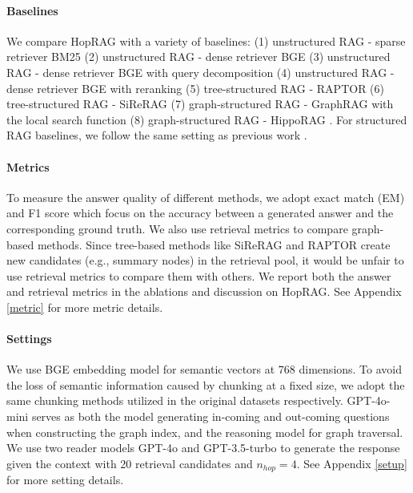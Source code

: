 \paragraph{Baselines}
We compare HopRAG with a variety of baselines: (1) unstructured RAG - sparse retriever BM25 \citep{robertson_probabilistic_2009} 
 (2) unstructured RAG - dense retriever BGE \citep{BGE,karpukhin2020densepassageretrievalopendomain} (3) unstructured RAG - dense retriever BGE with query decomposition \citep{min-etal-2019-multi} (4) unstructured RAG - dense retriever BGE with reranking \citep{nogueira2020passagererankingbert} (5) tree-structured RAG - RAPTOR \citep{sarthi_raptor_2024} (6) tree-structured RAG - SiReRAG \citep{zhang2024sireragindexingsimilarrelated} (7) graph-structured RAG - GraphRAG \citep{edge_local_2024} with the local search function (8) graph-structured RAG - HippoRAG \citep{gutiérrez2025hipporagneurobiologicallyinspiredlongterm}. For structured RAG baselines, we follow the same setting as previous work \citep{zhang2024sireragindexingsimilarrelated}. 

\paragraph{Metrics}
To measure the answer quality of different methods, we adopt exact match (EM) and F1 score which focus on the accuracy between a generated answer and the corresponding ground truth. We also use retrieval metrics to compare graph-based methods. Since tree-based methods like SiReRAG \citep{zhang2024sireragindexingsimilarrelated} and RAPTOR \citep{sarthi_raptor_2024} create new candidates (e.g., summary nodes) in the retrieval pool, it would be unfair to use retrieval metrics to compare them with others. We report both the answer and retrieval metrics in the ablations and discussion on HopRAG. See Appendix \ref{metric} for more metric details.
\paragraph{Settings}
We use BGE embedding model for semantic vectors at 768 dimensions. To avoid the loss of semantic information caused by chunking at a fixed size, we adopt the same chunking methods utilized in the original datasets respectively. 
GPT-4o-mini serves as both the model generating in-coming and out-coming questions when constructing the graph index, and the reasoning model for graph traversal. We use two reader models GPT-4o and GPT-3.5-turbo to generate the response given the context with 20 retrieval candidates and $n_{hop}=4$. See Appendix \ref{setup} for more setting details. 
